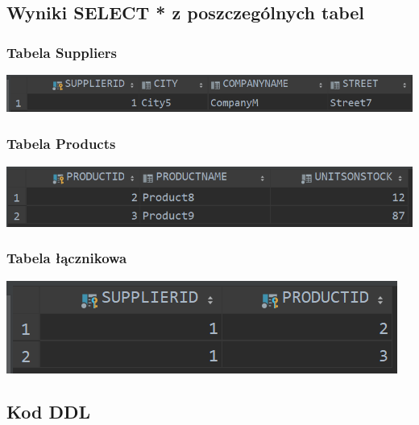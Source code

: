 \documentclass[a4paper, 11pt]{article}
\begin{document}
    \newpage

    \subsection{Wyniki SELECT * z poszczególnych tabel}
    \subsubsection{Tabela Suppliers}
    \begin{center}
        \includegraphics{images/point5/SelectSuppliers.png}
    \end{center}

    \subsubsection{Tabela Products}
    \begin{center}
        \includegraphics[scale=0.9]{images/point5/SelectProducts.png}
    \end{center}

    \subsubsection{Tabela łącznikowa}
    \begin{center}
        \includegraphics{images/point5/SelectJoinTable.png}
    \end{center}

    \newpage

    \subsection{Kod DDL}
    
\end{document}
